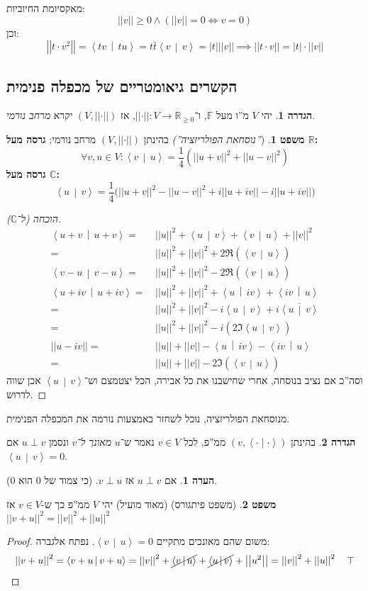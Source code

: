 \documentclass[a4paper]{article}
\newcommand\R     {\mathbb{R}}
\newcommand\C     {\mathbb{C}}
\newcommand\ra    {\rangle}
\newcommand\la    {\langle}
\newcommand\ol    {\overline}
\newcommand\F         {\mathbb{F}}
\newcommand\co        {\colon}
\newcommand\norm[1]   {\left \vert \left \vert #1 \right \vert \right \vert}
\newcommand\snorm     {\left \vert \left \vert \cdot \right \vert \right \vert}
\newcommand\smut      {\left \la \cdot \mid \cdot \right \ra}
\newcommand\mut [2]   {\left \la #1 \,\middle\vert\, #2 \right \ra}
\newcommand\sof[1]    {\left | #1 \right |}
\theoremstyle{definition}
\newtheorem{Theorem}{משפט}
\newtheorem{definition}{הגדרה}
\newtheorem{Remark}{הערה}
\newcommand\theo  [1] {\begin{Theorem}#1\end{Theorem}}
\newcommand\defi  [1] {\begin{definition}#1\end{definition}}
\newcommand\rmark [1] {\begin{Remark}#1\end{Remark}}
\begin{document}
	מאקסיומת החיוביות: 
	\[ \norm{v} \ge 0 \land (\norm{v} = 0 \iff v = 0) \]
	וכן: 
	\[ \norm{t \cdot v^2} = \mut{tv}{tu} = t \bar t\mut{v}{v} = \sof{t}\norm{v} \implies \norm{t \cdot v} = \sof{t} \cdot \norm{v} \]
	
	\newpage
	\subsection{הקשרים גיאומטריים של מכפלה פנימית}
	\defi{יהי $V$ מ''ו מעל $\F$, ו־$\snorm \co V \to \R_{\ge 0}$, אז $(V, \snorm)$ יקרא \textit{מרחב נורמי}. }
	\theo{(\textit{''נוסחאת הפולריזציה'')} בהינתן $(V, \snorm)$ מרחב נורמי;
		\textbf{גרסה מעל $\R$: }
		\[ \forall v, u \in V \co \mut{v}{u} = \frac{1}{4}(\norm{u + v}^2 + \norm{u - v}^2) \]
		\textbf{גרסה מעל $\C$: }
		\[ \mut{u}{v} = \frac{1}{4}\Big(\norm{u + v}^2 - \norm{u - v}^2 + i\norm{u + iv} - i\norm{u + iv}\Big) \]
	}
	\begin{proof}[הוכחה (ל־$\C$)]
		\begin{align*}
			\mut{u + v}{u + v} =\,& \norm{u}^2 + \mut{u}{v} + \mut{v}{u} + \norm{v}^2 \\
			=\,& \norm{u}^2 + \norm{v}^2 + 2\Re(\mut{v}{u}) \\
			\mut{v - u}{v - u} = \, & \norm{u}^2 + \norm{v}^2 - 2\Re(\mut{v}{u}) \\
			\mut{u + iv}{u + iv} =\,& \norm{u}^2 + \norm{v}^2 + \mut{u}{iv} + \mut{iv}{u}  \\
			=\,& \norm{u}^2 + \norm{v}^2 - i\mut{u}{v} + i\ol{\mut{u}{v}} \\
			=\,& \norm{u}^2 + \norm{v}^2 - i(2 \Im\mut{u}{v}) \\
			\norm{u - iv} =\,& \norm{u} + \norm{v} - \mut{u}{iv} - \mut{iv}{u} \\
			=\,& \norm{u} + \norm{v} - 2\Im(\mut{v}{u})
		\end{align*}
		וסה''כ אם נציב בנוסחה, אחרי שחישבנו את כל אבירה, הכל יצטמצם וש־$\mut{u}{v}$ אכן שווה לדרוש. 
	\end{proof}
	
	מנוסחאת הפולריזציה, נוכל לשחזר באמצעות נורמה את המכפלה הפנימית. 
	
	\defi{בהינתן $(v, \smut)$ ממ''פ, לכל $v \in V$ נאמר ש־$u$ \textit{מאונך ל־$v$} ונסמן $u\perp v$ אם $\mut{u}{v} = 0$. }
	
	\rmark{אם $u \perp v$ אז $v \perp u$. (כי צמוד של $0$ הוא $0$). }
	
	\theo{(משפט פיתגורס) (מאוד מועיל) יהי $V$ ממ''פ כך ש-$v \in V$ אז $\norm{v + u}^2 = \norm{v}^2 + \norm{u}^2$}\begin{proof} משום שהם מאונכים מתקיים $\mut{v}{u} = 0$. נפתח אלגברה: 
		\[ \norm{v + u}^2 = \mut{v + u}{v + u} = \norm{v}^2 + \cancel{\mut{v}{u}} + \cancel{\mut{u}{v}} + \norm{u^2} = \norm{v}^2 + \norm{u}^2 \quad \top \]
	\end{proof}
	
\end{document}
